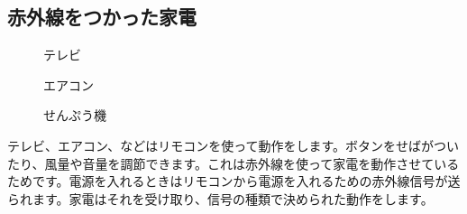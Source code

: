 \subsection{赤外線をつかった家電}

\begin{figure}[H]
  \begin{minipage}[t]{0.3\columnwidth}
    \centering
 
    \caption{テレビ}
  \end{minipage}
  \begin{minipage}[t]{0.3\columnwidth}
    \centering
    
    \caption{エアコン}
  \end{minipage}
  \begin{minipage}[t]{0.3\columnwidth}
    \centering
    
    \caption{せんぷう機}
  \end{minipage}
\end{figure}

テレビ、エアコン、などはリモコンを使って動作をします。ボタンをせばがついたり、風量や音量を調節できます。これは赤外線を使って家電を動作させているためです。電源を入れるときはリモコンから電源を入れるための赤外線信号が送られます。家電はそれを受け取り、信号の種類で決められた動作をします。
